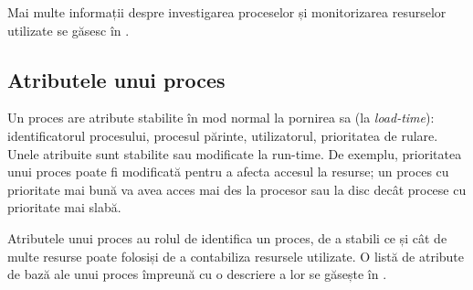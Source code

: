 Mai multe informații despre investigarea proceselor și monitorizarea resurselor
utilizate se găsesc în .

\subsection{Atributele unui proces}
\label{sec:process-resurse-atribute}

Un proces are atribute stabilite în mod normal la pornirea sa (la \textit{load-time}):
identificatorul procesului, procesul părinte, utilizatorul, prioritatea de
rulare. Unele atribuite sunt stabilite sau modificate la run-time. De exemplu,
prioritatea unui proces poate fi modificată pentru a afecta accesul la resurse;
un proces cu prioritate mai bună va avea acces mai des la procesor sau la disc
decât procese cu prioritate mai slabă.

Atributele unui proces au rolul de identifica un proces, de a stabili ce și cât
de multe resurse poate folosiși de a contabiliza resursele utilizate. O listă de
atribute de bază ale unui proces împreună cu o descriere a lor se găsește în
.

